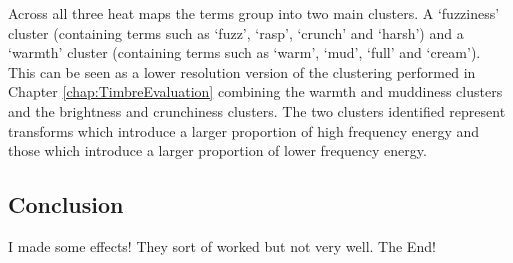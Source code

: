 			Across all three heat maps the terms group into two main clusters. A `fuzziness' cluster
			(containing terms such as `fuzz', `rasp', `crunch' and `harsh') and a `warmth' cluster (containing
			terms such as `warm', `mud', `full' and `cream'). This can be seen as a lower resolution version of
			the clustering performed in Chapter \ref{chap:TimbreEvaluation} combining the warmth and muddiness
			clusters and the brightness and crunchiness clusters. The two clusters identified represent
			transforms which introduce a larger proportion of high frequency energy and those which introduce a
			larger proportion of lower frequency energy.

	\subsection{Conclusion}
	\label{sec:PerceptualExperiments-SemanticControl-Conclusion}
		\note
		{
			I made some effects! They sort of worked but not very well. The End!
		}
